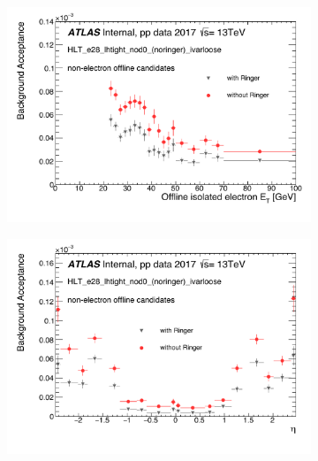 \begin{figure}[h!tb]
\begin{center}
\begin{subfigure}[c]{.48\textwidth}
\centering
\includegraphics[width=\textwidth]{sections/operation/figures/efficiencies/eff_EGAM7_e28_ringer_and_noringer_2017_after_ts1_et.pdf}
\caption{}
\end{subfigure}
\hfill
\begin{subfigure}[c]{.48\textwidth}
\centering
\includegraphics[width=\textwidth]{sections/operation/figures/efficiencies/eff_EGAM7_e28_ringer_and_noringer_2017_after_ts1_eta.pdf}
\caption{}
\end{subfigure} \\
\begin{subfigure}[c]{.48\textwidth}

\end{subfigure}
\end{center}
\end{figure}
